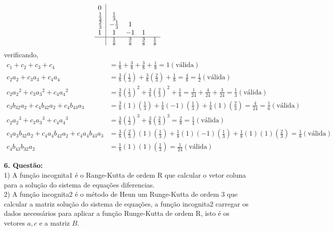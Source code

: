 \documentclass[a4paper,12pt]{article}
\begin{document}
{\arraycolsep=3.4pt\def\arraystretch{1.4}
\[
	\begin{array}{l|cccc} 
		0 &  & & \\
		\frac{1}{3} & \frac{1}{3} & & & \\
		\frac{2}{3} & -\frac{1}{3} & 1& &\\
		1 & 1 & -1 & 1 &\\
		\hline
		&\frac{1}{8} & \frac{3}{8} & \frac{3}{8} & \frac{1}{8}
	\end{array}
\]
}
verificando,
\begin{align*}
	c_1 + c_2 + c_3 + c_4 &=  \frac{1}{8} + \frac{3}{8} + \frac{3}{8} + \frac{1}{8} = 1 (\textrm{v\'alida}) \\
	c_2 a_2 + c_3 a_3  + c_4 a_4&= \frac{3}{8}\left (\frac{1}{3}\right ) + \frac{3}{8}\left (\frac{2}{3} \right )
	 +  \frac{1}{8}= \frac{4}{8} = \frac{1}{2} (\textrm{v\'alida})\\
	 c_2 {a_2}^{2} + c_3 {a_3}^{2} + c_4 {a_4}^{2}&= \frac{3}{8}{\left (\frac{1}{3}\right )}^{2} + \frac{3}{8}{\left
		 (\frac{2}{3} \right )}^{2}
		 +  \frac{1}{8} = \frac{1}{24} + \frac{4}{24} + \frac{3}{24} = \frac{1}{3} (\textrm{v\'alida})\\
		 c_3 b_{32} a_2 + c_4 b_{42}a_2  + c_4 b_{43} a_3 &= \frac{3}{8} (1)\left ( \frac{1}{3}\right ) + \frac{1}{8}
		 (-1)\left ( \frac{1}{3}\right ) + \frac{1}{8} (1)\left ( \frac{2}{3}\right ) = \frac{4}{24}= \frac{1}{6}(\textrm{v\'alida})\\
	c_2 {a_2}^{3} + c_3 {a_3}^{3} + c_4 {a_4}^{3}&=  \frac{3}{8}{\left (\frac{1}{3}\right )}^{3} + \frac{3}{8}{\left
		 (\frac{2}{3} \right )}^{3}
		 = \frac{2}{8}= \frac{1}{4} (\textrm{v\'alida})\\
	c_3 a_3 b_{32} a_2 + c_4 a_4 b_{42}a_2  + c_4 a_4 b_{43} a_3 &= \frac{3}{8}\left (\frac{2}{3}\right ) (1)\left (\frac{1}{3}\right ) 
	+ \frac{1}{8}(1) (-1)\left (\frac{1}{3}\right ) + \frac{1}{8}(1) (1)\left (\frac{2}{3}\right ) = \frac{1}{8}(\textrm{v\'alida})\\
	c_4 b_{43} b_{32} a_2 &= \frac{1}{8} (1) (1)\left ( \frac{1}{3}\right ) = \frac{1}{24}(\textrm{v\'alida})
\end{align*}

\textbf{6. Quest\~ao:}\\

1) A fun\c c\~ao incognita1 \'e o Range-Kutta de ordem R que calcular o vetor coluna para a solu\c c\~ao do sistema de equa\c
c\~oes diferencias. \\

2)
A fun\c c\~ao incognita2 \'e o m\'etodo de Heun um Runge-Kutta de ordem 3 que calcular a matriz solu\c c\~ao do sistema
de equa\c c\~oes, a fun\c c\~ao incognita2 carregar os dados necess\'arios para aplicar a fun\c c\~ao Runge-Kutta de
ordem R, isto \'e os vetores $a,c$ e a matriz $B$. \\
\end{document}
